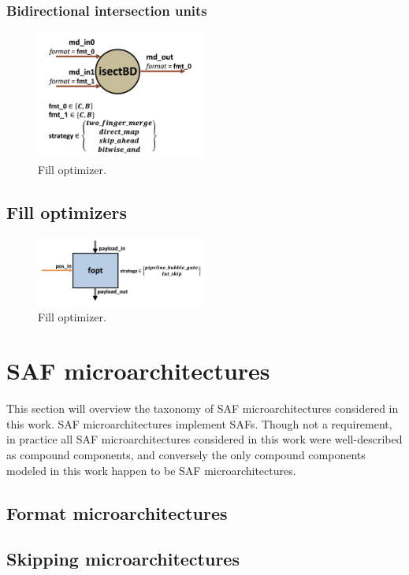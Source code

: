 \subsubsection{Bidirectional intersection units}

\begin{figure}[H]
    \centering
    \includegraphics[width=0.5\textwidth]{figures/isectbd.png}
    \caption{Fill optimizer.}
    \label{fig:fopt}
\end{figure}

\subsection{Fill optimizers}

\begin{figure}[H]
    \centering
    \includegraphics[width=0.5\textwidth]{figures/fopt.png}
    \caption{Fill optimizer.}
    \label{fig:fopt}
\end{figure}

\section{SAF microarchitectures}

This section will overview the taxonomy of SAF microarchitectures considered in this work. SAF microarchitectures implement SAFs. Though not a requirement, in practice all SAF microarchitectures considered in this work were well-described as compound components, and conversely the only compound components modeled in this work happen to be SAF microarchitectures.

\subsection{Format microarchitectures}

\subsection{Skipping microarchitectures}